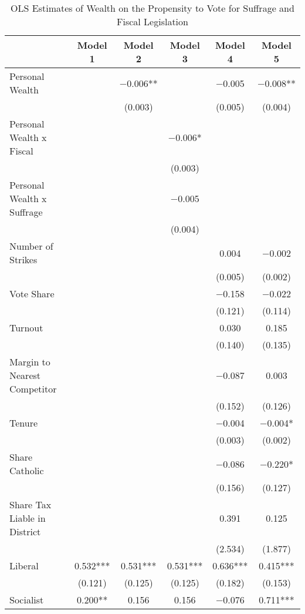 \begin{table}

\caption{\label{tab:ols_pooled_otherclassific_lawpartyint}OLS Estimates of Wealth on the Propensity to Vote for Suffrage and Fiscal Legislation}
\centering
\begin{tabular}[t]{lccccc}
\toprule
  & Model 1 & Model 2 & Model 3 & Model 4 & Model 5\\
\midrule
Personal Wealth &  & \num{-0.006}** &  & \num{-0.005} & \num{-0.008}**\\
 &  & (\num{0.003}) &  & (\num{0.005}) & (\num{0.004})\\
Personal Wealth x Fiscal &  &  & \num{-0.006}* &  & \\
 &  &  & (\num{0.003}) &  & \\
Personal Wealth x Suffrage &  &  & \num{-0.005} &  & \\
 &  &  & (\num{0.004}) &  & \\
Number of Strikes &  &  &  & \num{0.004} & \num{-0.002}\\
 &  &  &  & (\num{0.005}) & (\num{0.002})\\
Vote Share &  &  &  & \num{-0.158} & \num{-0.022}\\
 &  &  &  & (\num{0.121}) & (\num{0.114})\\
Turnout &  &  &  & \num{0.030} & \num{0.185}\\
 &  &  &  & (\num{0.140}) & (\num{0.135})\\
Margin to Nearest Competitor &  &  &  & \num{-0.087} & \num{0.003}\\
 &  &  &  & (\num{0.152}) & (\num{0.126})\\
Tenure &  &  &  & \num{-0.004} & \num{-0.004}*\\
 &  &  &  & (\num{0.003}) & (\num{0.002})\\
Share Catholic &  &  &  & \num{-0.086} & \num{-0.220}*\\
 &  &  &  & (\num{0.156}) & (\num{0.127})\\
Share Tax Liable in District &  &  &  & \num{0.391} & \num{0.125}\\
 &  &  &  & (\num{2.534}) & (\num{1.877})\\
Liberal & \num{0.532}*** & \num{0.531}*** & \num{0.531}*** & \num{0.636}*** & \num{0.415}***\\
 & (\num{0.121}) & (\num{0.125}) & (\num{0.125}) & (\num{0.182}) & (\num{0.153})\\
Socialist & \num{0.200}** & \num{0.156} & \num{0.156} & \num{-0.076} & \num{0.711}***\\

\end{tabular}
\end{table}

